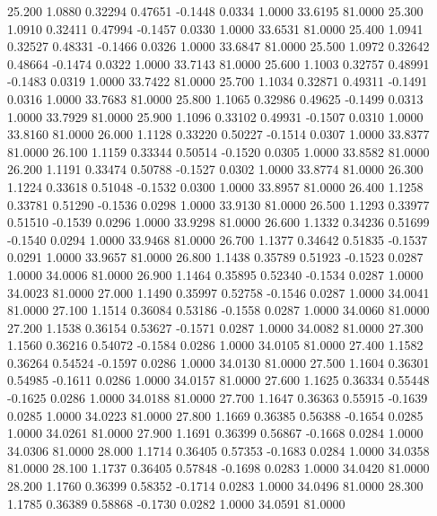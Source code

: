   25.200   1.0880   0.32294   0.47651  -0.1448   0.0334   1.0000  33.6195  81.0000
  25.300   1.0910   0.32411   0.47994  -0.1457   0.0330   1.0000  33.6531  81.0000
  25.400   1.0941   0.32527   0.48331  -0.1466   0.0326   1.0000  33.6847  81.0000
  25.500   1.0972   0.32642   0.48664  -0.1474   0.0322   1.0000  33.7143  81.0000
  25.600   1.1003   0.32757   0.48991  -0.1483   0.0319   1.0000  33.7422  81.0000
  25.700   1.1034   0.32871   0.49311  -0.1491   0.0316   1.0000  33.7683  81.0000
  25.800   1.1065   0.32986   0.49625  -0.1499   0.0313   1.0000  33.7929  81.0000
  25.900   1.1096   0.33102   0.49931  -0.1507   0.0310   1.0000  33.8160  81.0000
  26.000   1.1128   0.33220   0.50227  -0.1514   0.0307   1.0000  33.8377  81.0000
  26.100   1.1159   0.33344   0.50514  -0.1520   0.0305   1.0000  33.8582  81.0000
  26.200   1.1191   0.33474   0.50788  -0.1527   0.0302   1.0000  33.8774  81.0000
  26.300   1.1224   0.33618   0.51048  -0.1532   0.0300   1.0000  33.8957  81.0000
  26.400   1.1258   0.33781   0.51290  -0.1536   0.0298   1.0000  33.9130  81.0000
  26.500   1.1293   0.33977   0.51510  -0.1539   0.0296   1.0000  33.9298  81.0000
  26.600   1.1332   0.34236   0.51699  -0.1540   0.0294   1.0000  33.9468  81.0000
  26.700   1.1377   0.34642   0.51835  -0.1537   0.0291   1.0000  33.9657  81.0000
  26.800   1.1438   0.35789   0.51923  -0.1523   0.0287   1.0000  34.0006  81.0000
  26.900   1.1464   0.35895   0.52340  -0.1534   0.0287   1.0000  34.0023  81.0000
  27.000   1.1490   0.35997   0.52758  -0.1546   0.0287   1.0000  34.0041  81.0000
  27.100   1.1514   0.36084   0.53186  -0.1558   0.0287   1.0000  34.0060  81.0000
  27.200   1.1538   0.36154   0.53627  -0.1571   0.0287   1.0000  34.0082  81.0000
  27.300   1.1560   0.36216   0.54072  -0.1584   0.0286   1.0000  34.0105  81.0000
  27.400   1.1582   0.36264   0.54524  -0.1597   0.0286   1.0000  34.0130  81.0000
  27.500   1.1604   0.36301   0.54985  -0.1611   0.0286   1.0000  34.0157  81.0000
  27.600   1.1625   0.36334   0.55448  -0.1625   0.0286   1.0000  34.0188  81.0000
  27.700   1.1647   0.36363   0.55915  -0.1639   0.0285   1.0000  34.0223  81.0000
  27.800   1.1669   0.36385   0.56388  -0.1654   0.0285   1.0000  34.0261  81.0000
  27.900   1.1691   0.36399   0.56867  -0.1668   0.0284   1.0000  34.0306  81.0000
  28.000   1.1714   0.36405   0.57353  -0.1683   0.0284   1.0000  34.0358  81.0000
  28.100   1.1737   0.36405   0.57848  -0.1698   0.0283   1.0000  34.0420  81.0000
  28.200   1.1760   0.36399   0.58352  -0.1714   0.0283   1.0000  34.0496  81.0000
  28.300   1.1785   0.36389   0.58868  -0.1730   0.0282   1.0000  34.0591  81.0000
